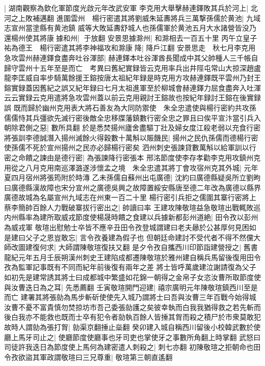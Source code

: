 |{
	湖南觀察為欽化軍節度光啟元年改武安軍}
李克用大舉擊赫連鐸敗其兵於河上|{
	北河之上敗補邁翻}
進圍雲州　楊行密遣其將劉威朱延夀將兵三萬撃孫儒於黄池|{
	九域志宣州當塗縣有黄池鎮}
威等大敗延夀舒城人也孫儒軍於黄池五月大水諸營皆没乃還楊州使其將康據和州|{
	于放翻}
安景思據滁州|{
	和滁相去一百五十里}
丙午立皇子祐為德王　楊行密遣其將李神福攻和滁康降|{
	降戶江翻}
安景思走　秋七月李克用急攻雲州赫連鐸食盡奔吐谷渾部|{
	赫連鐸本吐谷渾酋長聞成中其父帥種人三千帳自歸守雲州十五年至是而亡　考異曰舊紀實録皆云克用率兵出井陘屯常山大掠深趙盧龍李匡威自率步騎萬餘援王鎔按唐太祖紀年録是時克用方攻赫連鐸既平雲州乃封王鎔實録蓋因舊紀之誤又紀年録曰七月太祖進軍至於柳城會赫連鐸力屈食盡奔入吐渾云云實録云克用遣將急攻雲州蓋以前云克用親討王鎔故也按紀年録討王鎔在後實録誤}
既而歸於幽州克用表大將石善友為大同防禦使　朱全忠遣使與楊行密約共攻孫儒儒恃其兵彊欲先滅行密後敵全忠移牒藩鎮數行密全忠之罪且曰俟平宣汴當引兵入朝除君側之惡|{
	數所具翻}
於是悉焚揚州廬舍盡驅丁壯及婦女度江殺老弱以充食行密將張訓李德誠潛入揚州滅餘火得穀數十萬斛以賑饑民|{
	揚州之民仇孫儒而德楊行密使孫儒不死於宣州揚州之民亦必歸楊行密矣}
泗州刺史張諫貸數萬斛以給軍訓以行密之命饋之諫由是德行密|{
	為張諫降行密張本}
邢洺節度使李存孝勸李克用攻鎮州克用從之八月克用南巡澤潞遂涉懷孟之境　朱全忠遣其將丁會攻宿州克其外城|{
	元年夏四月宿州將張筠附於時漙}
乙未孫儒自蘇州出屯廣德|{
	沈約曰廣德縣疑吳所立劉昫曰廣德縣漢故障也宋分宣州之廣德吳興之故障置綏安縣唐至德二年改為廣德以縣界廣德故城為名屬宣州九域志在州東一百二十里}
楊行密引兵拒之儒圍其寨行密將上蔡李簡帥百餘人力戰破寨拔行密出之|{
	帥讀曰率}
王建攻陳敬瑄益急敬瑄出戰輒敗巡内州縣率為建所取威戎節度使楊晟時饋之食建以兵據新都彭州道絶|{
	田令孜以彭州為威戎軍}
敬瑄出慰勉士卒皆不應辛丑田令孜登城謂建曰老夫曏於公甚厚何見困如是建曰父子之恩豈敢忘|{
	言令孜養建為假子也}
但朝廷命建討不受代者不得不然儻大師改圖建復何求|{
	大師謂陳敬瑄復扶又翻}
是夕令孜自攜西川印節詣建營授之|{
	舊書龍紀元年五月壬辰朔漢州刺史王建陷成都遷陳敬瑄於雅州建自稱兵馬留後復用田令孜為監軍記事既有不同而紀年前後復有兩年之差}
將士皆呼萬歲建泣謝請復為父子如初先是建常誘其將士曰成都城中繁盛如花錦一朝得之金帛子女恣汝曹所取節度使與汝曹迭日為之耳|{
	先悉薦翻}
壬寅敬瑄開門迎建|{
	禧宗廣明元年陳敬瑄鎮西川至是而亡}
建署其將張勍為馬步斬斫使使先入城乃謂將士曰吾與汝曹三年百戰今始得城汝曹不憂不富貴慎勿焚掠坊市吾己委張勍護之矣彼幸執而白我我猶得救之若先斬而後白我亦不能救也既而士卒有犯令者勍執百餘人皆捶其胷而殺之積尸於市衆莫敢犯故時人謂勍為張打胷|{
	勍渠京翻捶止橤翻}
癸卯建入城自稱西川留後小校韓武數於使廳上馬牙司止之|{
	使廳節度使廳事也牙司吏也掌使牙之事數所角翻上時掌翻}
武怒曰司徒許我迭日為節度使上馬何為建密遣人刺殺之|{
	刺七亦翻}
初陳敬瑄之拒朝命也田令孜欲盜其軍政謂敬瑄曰三兄尊重|{
	敬瑄第三朝直遙翻}
